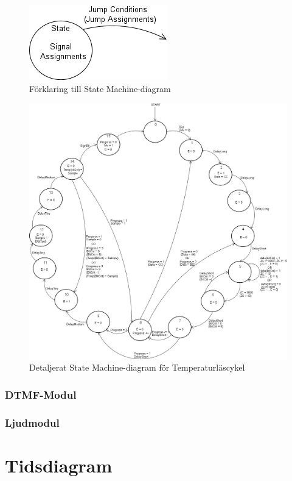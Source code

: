 \documentclass[a4paper,11pt]{article}
\begin{document}
	\begin{figure}[h!tb]
	  \centering
	      \includegraphics[scale=0.5, angle=0]{StateMachineExplained.png}
	  	\caption{Förklaring till State Machine-diagram}
	\end{figure}

	\begin{figure}[h!tb]
	  \centering
	      \includegraphics[scale=0.4, angle=0]{TempStateMachineDiagram.png}
	  	\caption{Detaljerat State Machine-diagram för Temperaturläscykel}
	\end{figure}

		\subsubsection{DTMF-Modul}
		\subsubsection{Ljudmodul}

\section{Tidsdiagram}
\end{document}
